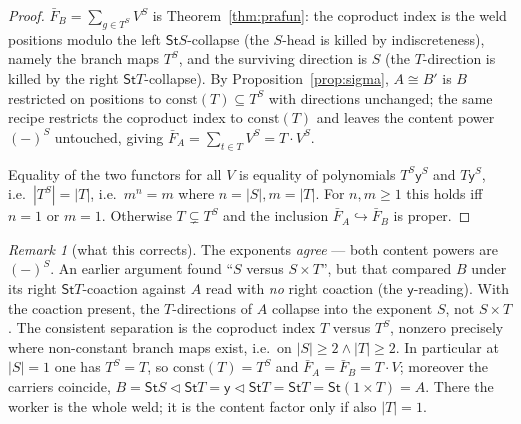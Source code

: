 \documentclass[11pt]{article}
\newcommand{\comp}{\mathbin{\triangleleft}}       %
\newcommand{\St}{\mathsf{St}}                      %
\newcommand{\y}{\mathsf{y}}
\newcommand{\const}{\mathrm{const}}
\theoremstyle{plain}
\theoremstyle{definition}
\theoremstyle{remark}
\newtheorem{remark}{Remark}
\begin{document}
\begin{proof}
$\bar F_B=\sum_{g\in T^S}V^S$ is Theorem~\ref{thm:prafun}: the coproduct index is the weld
positions modulo the left $\St S$-collapse (the $S$-head is killed by indiscreteness),
namely the branch maps $T^S$, and the surviving direction is $S$ (the $T$-direction is
killed by the right $\St T$-collapse). By Proposition~\ref{prop:sigma}, $A\cong B'$ is $B$
restricted on positions to $\const(T)\subseteq T^S$ with directions unchanged; the same
recipe restricts the coproduct index to $\const(T)$ and leaves the content power $(-)^S$
untouched, giving $\bar F_A=\sum_{t\in T}V^S=T\cdot V^S$.

Equality of the two functors for all $V$ is equality of polynomials $T^S\y^S$ and $T\y^S$,
i.e.\ $|T^S|=|T|$, i.e.\ $m^n=m$ where $n=|S|,m=|T|$. For $n,m\ge1$ this holds iff $n=1$ or
$m=1$. Otherwise $T\subsetneq T^S$ and the inclusion $\bar F_A\hookrightarrow\bar F_B$ is
proper.
\end{proof}

\begin{remark}[what this corrects]
The exponents \emph{agree} --- both content powers are $(-)^S$. An earlier argument found
``$S$ versus $S\times T$'', but that compared $B$ under its right $\St T$-coaction against
$A$ read with \emph{no} right coaction (the $\y$-reading). With the coaction present, the
$T$-directions of $A$ collapse into the exponent $S$, not $S\times T$. The consistent
separation is the coproduct index $T$ versus $T^S$, nonzero precisely where non-constant
branch maps exist, i.e.\ on $|S|\ge2\wedge|T|\ge2$. In particular at $|S|=1$ one has
$T^S=T$, so $\const(T)=T^S$ and $\bar F_A=\bar F_B=T\cdot V$; moreover the carriers coincide,
$B=\St S\comp\St T=\y\comp\St T=\St T=\St(1\times T)=A$. There the worker is the whole
weld; it is the content factor only if also $|T|=1$.
\end{remark}
\end{document}
